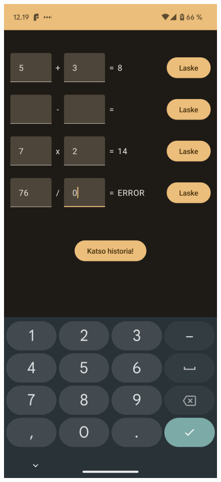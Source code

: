 \begin{figure}[h!]
\centering
\begin{minipage}[b]{.4\textwidth}
    \includegraphics[width=\textwidth]{figures/exercise-5-final-1.png}

\end{minipage}
\end{figure}
